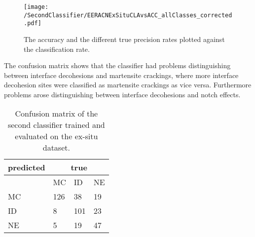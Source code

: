 \begin{figure}[H]
\centering
\texttt{[image: /SecondClassifier/EERACNExSituCLAvsACC\_allClasses\_corrected.pdf]}
\caption{The accuracy and the different true precision rates plotted against the classification rate.}
\label{fig:EERACNExSituCLAvsACC_allClasses}
\end{figure}
The confusion matrix shows that the classifier had problems distinguishing between interface decohesions and martensite crackings, where more interface decohesion sites were classified as martensite crackings as vice versa. Furthermore problems arose distinguishing between interface decohesions and notch effects. \\

\begin{table}[H]
 \begin{center}
  \begin{tabular}{@{} *4l @{}} \toprule[2pt]
   predicted &  \multicolumn{3}{c}{true}  \\\midrule
    & MC  & ID & NE   \\ 
   MC  & 126 & 38 & 19 \\ 
   ID  & 8 & 101 & 23 \\ 
   NE  & 5 & 19 & 47 \\ \bottomrule[2pt]
  \end{tabular}
 \end{center}
 \caption{Confusion matrix of the second classifier trained and evaluated on the ex-situ dataset.}
   \label{tab:SecondClassifierConfusionMatrixExSitu}
\end{table}


